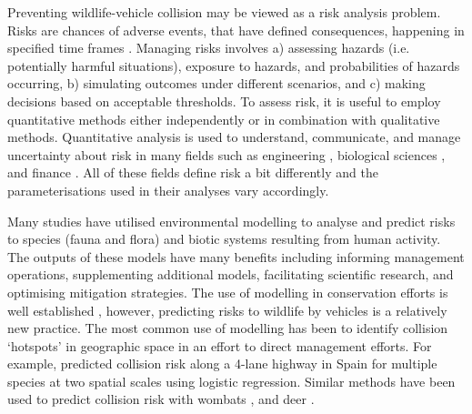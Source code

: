 Preventing wildlife-vehicle collision may be viewed as a risk analysis problem. Risks are chances of adverse events, that have defined consequences, happening in specified time frames \citep{burg05}. Managing risks involves a) assessing hazards (i.e. potentially harmful situations), exposure to hazards, and probabilities of hazards occurring, b) simulating outcomes under different scenarios, and c) making decisions based on acceptable thresholds. To assess risk, it is useful to employ quantitative methods either independently or in combination with qualitative methods. Quantitative analysis is used to understand, communicate, and manage uncertainty about risk in many fields such as engineering \citep[e.g.][]{apos04}, biological sciences \citep[e.g.][]{sute16}, and finance \citep[e.g.][]{mcne15}.  All of these fields define risk a bit differently and the parameterisations used in their analyses vary accordingly.

Many studies have utilised environmental modelling to analyse and predict risks to species (fauna and flora) and biotic systems resulting from human activity. The outputs of these models have many benefits including informing management operations, supplementing additional models, facilitating scientific research, and optimising mitigation strategies. The use of modelling in conservation efforts is well established \citep{star86}, however, predicting risks to wildlife by vehicles is a relatively new practice. The most common use of modelling has been to identify collision `hotspots' in geographic space in an effort to direct management efforts. For example, \cite{malo04} predicted collision risk along a 4-lane highway in Spain for multiple species at two spatial scales using logistic regression. Similar methods have been used to predict collision risk with wombats \citep{roge09}, and deer \citep{sudh09}.

